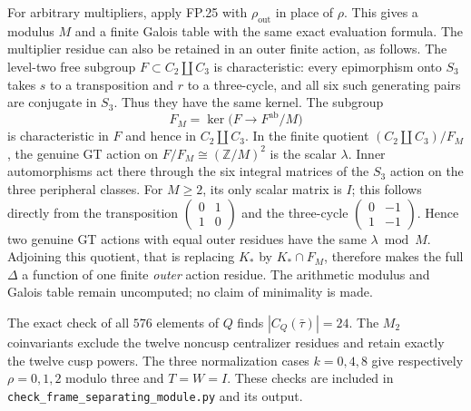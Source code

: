 For arbitrary multipliers, apply FP.25 with $\rho_{\mathrm{out}}$
in place of $\rho$. This gives a modulus $M$ and a finite Galois table
with the same exact evaluation formula. The multiplier residue can
also be retained in an outer finite action, as follows. The level-two
free subgroup $F\subset C_2\amalg C_3$ is characteristic: every
epimorphism onto $S_3$ takes $s$ to a transposition and $r$ to a
three-cycle, and all six such generating pairs are conjugate in $S_3$.
Thus they have the same kernel. The subgroup
\[
 F_M=\ker\bigl(F\longrightarrow F^{\mathrm{ab}}/M\bigr)
\]
is characteristic in $F$ and hence in $C_2\amalg C_3$.
In the finite quotient $(C_2\amalg C_3)/F_M$, the genuine GT action
on $F/F_M\cong(\mathbb Z/M)^2$ is the scalar $\lambda$.
Inner automorphisms act there through the six integral matrices of
the $S_3$ action on the three peripheral classes. For $M\geq2$, its
only scalar matrix is $I$; this follows directly from the transposition
$\left(\begin{smallmatrix}0&1\\1&0\end{smallmatrix}\right)$ and
the three-cycle
$\left(\begin{smallmatrix}0&-1\\1&-1\end{smallmatrix}\right)$.
Hence two genuine GT actions with equal outer residues have the same
$\lambda\bmod M$.
Adjoining this quotient, that is replacing $K_*$ by $K_*\cap F_M$,
therefore makes the full $\Delta$ a function of one finite
\emph{outer} action residue. The arithmetic modulus and Galois table
remain uncomputed; no claim of minimality is made.

The exact check of all $576$ elements of $Q$ finds
$|C_Q(\bar\tau)|=24$. The $M_2$ coinvariants exclude the twelve
noncusp centralizer residues and retain exactly the twelve cusp powers.
The three normalization cases $k=0,4,8$ give respectively
$\rho=0,1,2$ modulo three and $T=W=I$.
These checks are included in
\texttt{check\_frame\_separating\_module.py} and its output.

